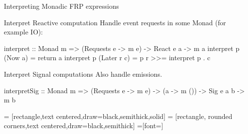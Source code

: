 \documentclass{beamer}
\begin{document}
\begin{frame}{Interpreting Monadic FRP expressions}
\begin{block}{Interpret Reactive computation}
Handle event requests in some Monad (for example IO):
\begin{code}
interpret ::  Monad m => (Requests e -> m e) 
              -> React e a -> m a
interpret p (Now a)      = return a
interpret p (Later r c)  = p r >>= interpret p . c
\end{code}
\end{block}

\begin{block}{Interpret Signal computations}
Also handle emissions.
\begin{code}
interpretSig ::  Monad m  => (Requests e -> m e) 
                 -> (a -> m ()) -> Sig e a b -> m b
\end{code}
\end{block}

\end{frame}



 = [rectangle,text centered,draw=black,semithick,solid]
 = [rectangle, rounded corners,text centered,draw=black,semithick]
 =[font=\small]
\end{document}
